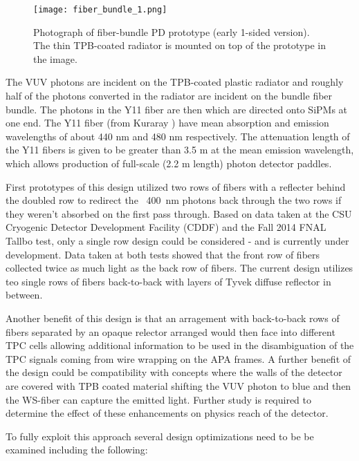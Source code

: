 \begin{figure}[hp!]
  \centering
  \texttt{[image: fiber\_bundle\_1.png]}
\caption{Photograph of fiber-bundle PD prototype (early 1-sided
  version). The thin TPB-coated radiator is mounted on top of the
  prototype in the image.}
\label{fiber_bundle}
\end{figure}

The VUV photons are incident on the TPB-coated plastic radiator and
roughly half of the photons converted in the radiator are incident on
the bundle fiber bundle. The photons in the Y11 fiber are then which
are directed onto SiPMs at one end. The Y11 fiber (from Kuraray ) have
mean absorption and emission wavelengths of about 440 nm and 480 nm
respectively.  The attenuation length of the Y11 fibers is given to be
greater than 3.5 m at the mean emission wavelength, which allows
production of full-scale (2.2 m length) photon detector paddles.

First prototypes of this design utilized two rows of fibers with a
reflecter behind the doubled row to redirect the ~400~nm photons back
through the two rows if they weren't absorbed on the first pass
through. Based on data taken at the CSU Cryogenic Detector Development
Facility (CDDF) and the Fall 2014 FNAL Tallbo test, only a single row
design could be considered - and is currently under development. Data
taken at both tests showed that the front row of fibers collected
twice as much light as the back row of fibers. The current design
utilizes teo single rows of fibers back-to-back with layers of Tyvek
diffuse reflector in between.

Another benefit of this design is that an arragement with back-to-back
rows of fibers separated by an opaque relector arranged would then
face into different TPC cells allowing additional information to be
used in the disambiguation of the TPC signals coming from wire
wrapping on the APA frames. A further benefit of the design could be
compatibility with concepts where the walls of the detector are
covered with TPB coated material shifting the VUV photon to blue and
then the WS-fiber can capture the emitted light. Further study is
required to determine the effect of these enhancements on physics
reach of the detector. 

To fully exploit this approach several design optimizations need to be
be examined including the following:

